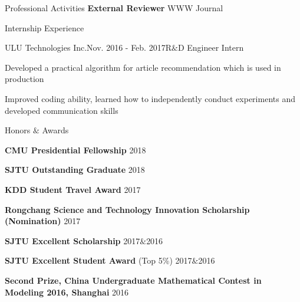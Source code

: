 \documentclass{resume} %
\begin{document}
\vspace{-20pt}
\begin{rSection}{Professional Activities}
\textbf{External Reviewer} \hfill WWW Journal
\end{rSection}


\begin{rSection}{Internship Experience}
\begin{rSubsection}{ULU Technologies Inc.}{Nov. 2016 - Feb. 2017}{R$\&$D  Engineer Intern}{}
\item Developed a practical algorithm for article recommendation which is used in production 
\item Improved coding ability, learned how to independently conduct experiments and developed communication skills
\end{rSubsection}
\end{rSection}



\begin{rSection}{Honors $\&$ Awards}
\begin{rSubsection}{}{}{}{}
\item[] \textbf{CMU Presidential Fellowship} \hfill{2018}
\item[] \textbf{SJTU Outstanding Graduate} \hfill{2018}
\item[] \textbf{KDD Student Travel Award} \hfill{2017}
\item[] \textbf{Rongchang Science and Technology Innovation Scholarship (Nomination)} \hfill{2017}
\item[] \textbf{SJTU Excellent Scholarship} \hfill{2017$\&$2016}
\item[] \textbf{SJTU Excellent Student Award} (Top 5\%)  \hfill{2017$\&$2016}
\item[] \textbf{Second Prize, China Undergraduate Mathematical Contest in Modeling 2016, Shanghai} \hfill{2016}
\end{rSubsection}
\end{rSection}
\end{document}
